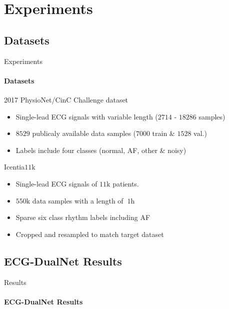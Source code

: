 \section{Experiments}

\subsection{Datasets}
\begin{frame}{Experiments}
\framesubtitle{Datasets}
    \begin{block}{2017 PhysioNet/CinC Challenge dataset \cite{Clifford2017}}
        \begin{itemize}
            \item Single-lead ECG signals with variable length ($2714$ - $18286$ samples)
            \item $8529$ publicaly available data samples ($7000$ train \& $1528$ val.)
            \item Labels include four classes (normal, AF, other \& noisy)
        \end{itemize}
    \end{block}
    \pause
    \begin{block}{Icentia$11\si{\kilo}$ \cite{Tan2019}}
        \begin{itemize}
            \item Single-lead ECG signals of $11\si{\kilo}$ patients.
            \item $550\si{\kilo}$ data samples with a length of $~1\si{\hour}$
            \item Sparse six class rhythm labels including AF
            \item Cropped and resampled to match target dataset
        \end{itemize}
    \end{block}
\end{frame}

\subsection{ECG-DualNet Results}
\begin{frame}{Results}
\framesubtitle{ECG-DualNet Results}
    \begin{table}[h!]
        \label{tab:results}
        \centering
        \scriptsize{\caption{Classification results of our proposed approaches and baselines on the 2017 PhysioNet validation set.}}
        
    \end{table}
\end{frame}

